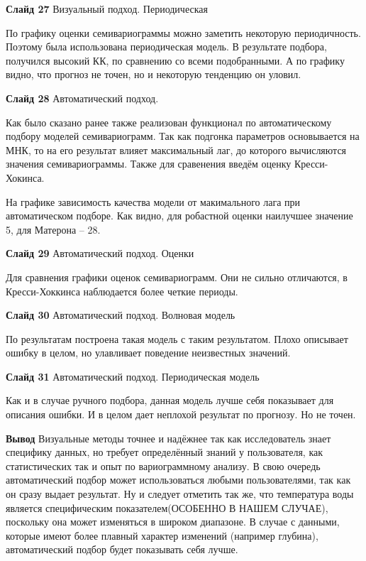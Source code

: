 \documentclass[a4paper,10pt]{report}
\begin{document}
\textbf{Слайд 27} Визуальный подход. Периодическая

По графику оценки семивариограммы можно заметить некоторую периодичность. Поэтому была использована периодическая модель. В результате подбора, получился высокий КК, по сравнению со всеми подобранными. А по графику видно, что прогноз не точен, но и некоторую тенденцию он уловил.

\textbf{Слайд 28} Автоматический подход.

Как было сказано ранее также реализован функционал по автоматическому подбору моделей семивариограмм. Так как подгонка параметров основывается на МНК, то на его результат влияет максимальный лаг, до которого вычисляются значения семивариограммы. Также для сравенения введём оценку Кресси-Хокинса.

На графике зависимость качества модели от макимального лага при автоматическом подборе. Как видно, для робастной оценки наилучшее значение 5, для Матерона -- 28.

\textbf{Слайд 29} Автоматический подход. Оценки

Для сравнения графики оценок семивариограмм. Они не сильно отличаются, в Кресси-Хоккинса наблюдается более четкие периоды.

\textbf{Слайд 30} Автоматический подход. Волновая модель

По результатам построена такая модель с таким результатом. Плохо описывает ошибку в целом, но улавливает поведение неизвестных значений.

\textbf{Слайд 31} Автоматический подход. Периодическая модель

Как и в случае ручного подбора, данная модель лучше себя показывает для описания ошибки. И в целом дает неплохой результат по прогнозу. Но не точен.

\textbf{Вывод} Визуальные методы точнее и надёжнее так как исследователь знает специфику данных, но требует определённый знаний у пользователя, как статистических так и опыт по вариограммному анализу. В свою очередь автоматический подбор может использоваться любыми пользователями, так как он сразу выдает результат. Ну и следует отметить так же, что температура воды является специфическим показателем(ОСОБЕННО В НАШЕМ СЛУЧАЕ), поскольку она может изменяться в широком диапазоне. В случае с данными, которые имеют более плавный характер изменений (например глубина), автоматический подбор будет показывать себя лучше.
\end{document}

